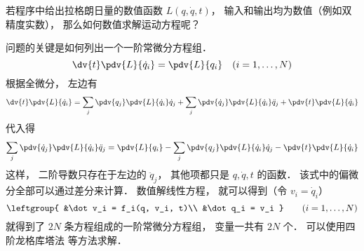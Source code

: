 
\begin{issues}
\issueDraft
\end{issues}


若程序中给出拉格朗日量的数值函数 $L(q, \dot q, t)$， 输入和输出均为数值（例如双精度实数）， 那么如何数值求解运动方程呢？

问题的关键是如何列出一个一阶常微分方程组．
\begin{equation}
\dv{t} \pdv{L}{\dot q_i} = \pdv{L}{q_i}
\quad (i=1,\dots,N)
\end{equation}
根据全微分， 左边有
\begin{equation}
\dv{t} \pdv{L}{\dot q_i} = \sum_j\pdv{q_j}\pdv{L}{\dot q_i}\dot q_j + \sum_j\pdv{\dot q_j}\pdv{L}{\dot q_i}\ddot q_j + \pdv{t}\pdv{L}{\dot q_i}
\end{equation}
代入得
\begin{equation}
\sum_j\pdv{\dot q_j}\pdv{L}{\dot q_i}\ddot q_j = \pdv{L}{q_i} - \sum_j\pdv{q_j}\pdv{L}{\dot q_i}\dot q_j - \pdv{t}\pdv{L}{\dot q_i}
\end{equation}
这样， 二阶导数只存在于左边的 $\ddot q_j$， 其他项都只是 $q,\dot q, t$ 的函数． 该式中的偏微分全部可以通过差分来计算． 数值解线性方程， 就可以得到（令 $v_i = \dot q_i$）
\begin{equation}
\leftgroup{
&\dot v_i = f_i(q, v_i, t)\\
&\dot q_i = v_i
}\qquad (i = 1,\dots,N)
\end{equation}
就得到了 $2N$ 条方程组成的一阶常微分方程组， 变量一共有 $2N$ 个． 可以使用四阶龙格库塔法 等方法求解．
